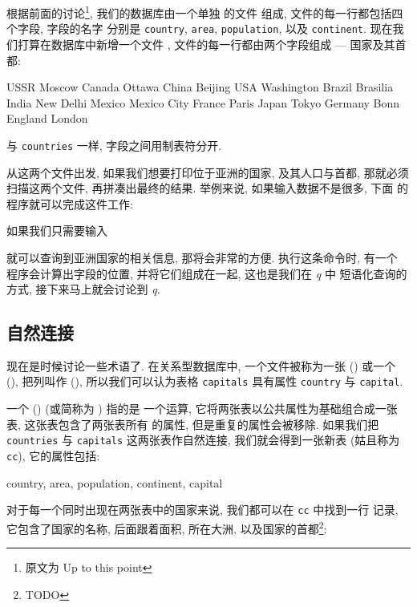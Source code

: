 根据前面的讨论\footnote{原文为 Up to this point}, 我们的数据库由一个单独
的文件  组成, 文件的每一行都包括四个字段, 字段的名字
分别是 \verb'country', \verb'area', \verb'population', 以及
\verb'continent'. 现在我们打算在数据库中新增一个文件 ,
文件的每一行都由两个字段组成 --- 国家及其首都:
\begin{shell}
    USSR    Moscow
    Canada  Ottawa
    China   Beijing
    USA     Washington
    Brazil  Brasilia
    India   New Delhi
    Mexico  Mexico City
    France  Paris
    Japan   Tokyo
    Germany Bonn
    England London
\end{shell}
与 \verb'countries' 一样, 字段之间用制表符分开.

从这两个文件出发, 如果我们想要打印位于亚洲的国家, 及其人口与首都, 那就必须
扫描这两个文件, 再拼凑出最终的结果. 举例来说, 如果输入数据不是很多, 下面
的程序就可以完成这件工作:

如果我们只需要输入
就可以查询到亚洲国家的相关信息, 那将会非常的方便. 执行这条命令时, 有一个
程序会计算出字段的位置, 并将它们组成在一起, 这也是我们在 \textit{q} 中
短语化查询的方式, 接下来马上就会讨论到 \textit{q}.

\subsection{自然连接}
\label{subsec:natural_joins}

现在是时候讨论一些术语了. 在关系型数据库中, 一个文件被称为一张  
() 或一个  (), 把列叫作 
(), 所以我们可以认为表格 \verb'capitals' 具有属性
\verb'country' 与 \verb'capital'.

一个  () (或简称为 ) 指的是 
一个运算, 它将两张表以公共属性为基础组合成一张表, 这张表包含了两张表所有
的属性, 但是重复的属性会被移除. 如果我们把 \verb'countries' 与
\verb'capitals' 这两张表作自然连接, 我们就会得到一张新表 (姑且称为
\verb'cc'), 它的属性包括:
\begin{file}
    country, area, population, continent, capital
\end{file}
对于每一个同时出现在两张表中的国家来说, 我们都可以在 \verb'cc' 中找到一行
记录, 它包含了国家的名称, 后面跟着面积, 所在大洲,
以及国家的首都\footnote{TODO}:
\begin{file}
\end{file}

